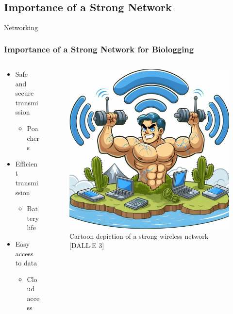 \documentclass{beamer}
\begin{document}
\subsection{Importance of a Strong Network}
  \begin{frame}{Networking}
    \frametitle{Importance of a Strong Network for Biologging}
    \begin{columns}
      \begin{column}{0.5\textwidth}
        \begin{itemize}
          \item Safe and secure transmission
          \begin{itemize}
            \item Poachers
          \end{itemize}
          \item Efficient transmission
          \begin{itemize}
            \item Battery life
          \end{itemize}
          \item Easy access to data
          \begin{itemize}
            \item Cloud access
          \end{itemize}
        \end{itemize}
      \end{column}
      \begin{column}{0.5\textwidth}
        \begin{figure}[htbp]
          \centering
          \includegraphics[width=.9\textwidth]{images/StrongNetwork.jpg}
          \caption{Cartoon depiction of a strong wireless network [DALL$\cdot$E 3]}
          \label{fig:Strong_wireless_network}
        \end{figure}
      \end{column}
    \end{columns}
  \end{frame}
\end{document}
